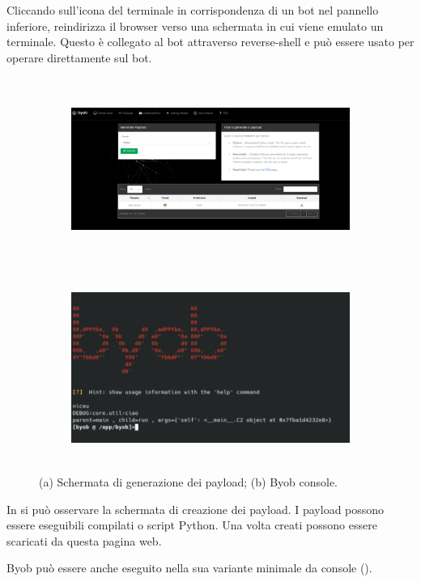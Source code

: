 Cliccando sull'icona del terminale in corrispondenza di un bot nel pannello inferiore, reindirizza il browser verso una schermata in cui viene emulato un terminale. Questo è collegato al bot attraverso reverse-shell e può essere usato per operare direttamente sul bot.
\begin{figure}[hbtp]
    \centering
    \begin{subfigure}{0.45\textwidth}
        \includegraphics[width=\textwidth , height=6cm]{res/fig/byob-payloads.png}
        \caption{}
        \label{fig:byobpayloads}
    \end{subfigure}
    \hfill
    \begin{subfigure}{0.45\textwidth}
        \centering
        \includegraphics[width=\textwidth , height=6cm]{res/fig/byob-console.png}
        \caption{}
        \label{fig:byobconsole}
    \end{subfigure}
    \caption{(a) Schermata di generazione dei payload; (b) Byob console.}
    \label{ciao2}
\end{figure}

In  si può osservare la schermata di creazione dei payload. I payload possono essere eseguibili compilati o script Python. Una volta creati possono essere scaricati da questa pagina web.

Byob può essere anche eseguito nella sua variante minimale da console ().


